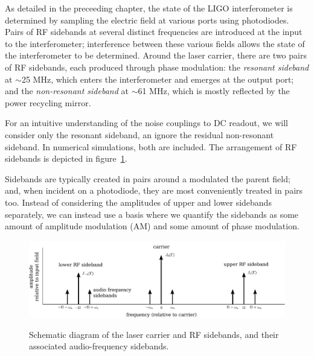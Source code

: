 As detailed in the preceeding chapter, the state of the LIGO interferometer is
determined by sampling the electric field at various ports using photodiodes.
Pairs of RF sidebands at several distinct frequencies are introduced at the
input to the interferometer; interference between these various fields allows
the state of the interferometer to be determined.  Around the laser carrier,
there are two pairs of RF sidebands, each produced through phase modulation: the
\emph{resonant sideband} at $\sim$25 MHz, which enters the interferometer and
emerges at the output port; and the \emph{non-resonant sideband} at $\sim$61
MHz, which is mostly reflected by the power recycling mirror.

For an intuitive understanding of the noise couplings to DC readout, we will
consider only the resonant sideband, an ignore the residual non-resonant
sideband.  In numerical simulations, both are included.  The arrangement of RF
sidebands is depicted in figure~\ref{fig:af-sidebands}.

Sidebands are typically created in pairs around a modulated the parent field;
and, when incident on a photodiode, they are most conveniently treated in pairs
too.  Instead of considering the amplitudes of upper and lower sidebands
separately, we can instead use a basis where we quantify the sidebands as some
amount of amplitude modulation (AM) and some amount of phase modulation.


\begin{figure}[]
\includegraphics[width=\columnwidth]{figures/af_sidebands.pdf}
\label{fig:af-sidebands}
\caption{Schematic diagram of the laser carrier and RF sidebands, and their
  associated audio-frequency sidebands.}
\end{figure}


